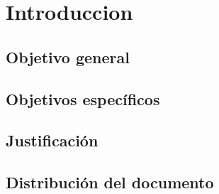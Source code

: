 \section{Introduccion}

\subsection{Objetivo general}

\subsection{Objetivos específicos}

\subsection{Justificación}

\subsection{Distribución del documento}

